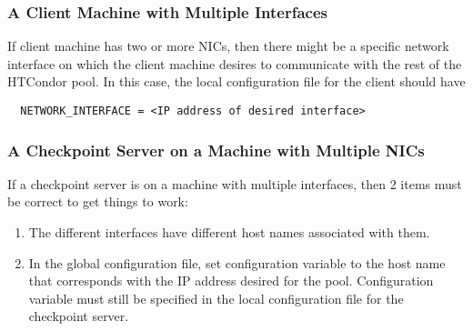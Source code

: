 \subsubsection{A Client Machine with Multiple Interfaces}

If client machine has two or more NICs, then there might be
a specific network interface on which the client machine desires to
communicate with the rest of the HTCondor pool. 
In this case, the local configuration file for the client should have
\begin{verbatim}
  NETWORK_INTERFACE = <IP address of desired interface>
\end{verbatim}

\subsubsection{A Checkpoint Server on a Machine with Multiple NICs}

If a checkpoint server is on a machine with multiple interfaces,
then 2 items must be correct to get things to work:
\begin{enumerate}
\item
The different interfaces have different host names associated with them.
\item
In the global configuration file,
set configuration variable  to the host name
that corresponds with the IP address desired for the pool.
Configuration variable  must still be specified
in the local configuration file for the checkpoint server.
\end{enumerate}

